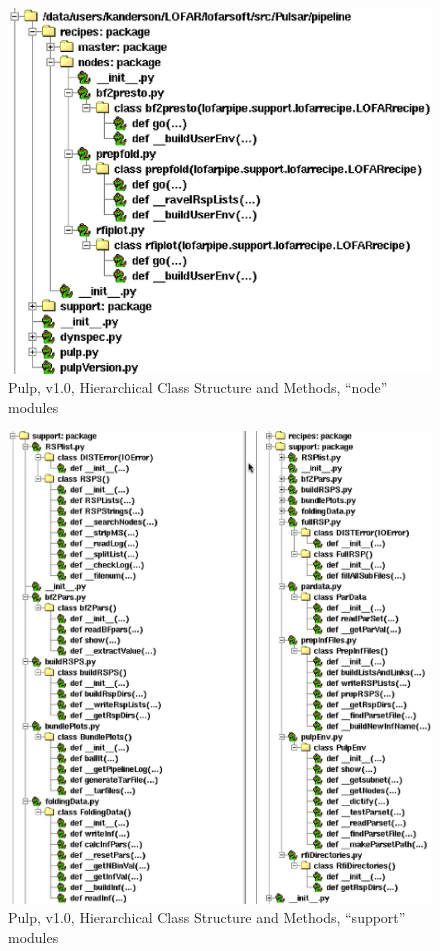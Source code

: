 \documentclass[a4paper,10pt,bibtotoc]{scrartcl}
\begin{document}
\begin{figure}[htbp] 
  \begin{center}
    \includegraphics[scale=0.90]{pulpNode.eps}
  \end{center}
  \caption{Pulp, v1.0, Hierarchical Class Structure and Methods,
    ``node'' modules}
  \label{fig:fpppic}
\end{figure}

\begin{figure}[htbp] 
  \begin{center}
    \includegraphics[scale=0.70]{pulpSupport.eps}
  \end{center}
  \caption{Pulp, v1.0, Hierarchical Class Structure and Methods,
    ``support'' modules}
  \label{fig:fpppic}
\end{figure}
\end{document}
